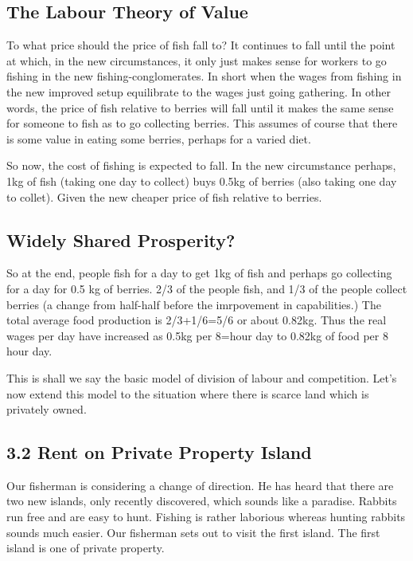 \documentclass[]{tufte-handout}
\begin{document}
\hypertarget{the-labour-theory-of-value}{%
\subsection{The Labour Theory of
Value}\label{the-labour-theory-of-value}}

To what price should the price of fish fall to? It continues to fall
until the point at which, in the new circumstances, it only just makes
sense for workers to go fishing in the new fishing-conglomerates. In
short when the wages from fishing in the new improved setup equilibrate
to the wages just going gathering. In other words, the price of fish
relative to berries will fall until it makes the same sense for someone
to fish as to go collecting berries. This assumes of course that there
is some value in eating some berries, perhaps for a varied diet.

So now, the cost of fishing is expected to fall. In the new circumstance
perhaps, 1kg of fish (taking one day to collect) buys 0.5kg of berries
(also taking one day to collet). Given the new cheaper price of fish
relative to berries.

\hypertarget{widely-shared-prosperity}{%
\subsection{Widely Shared Prosperity?}\label{widely-shared-prosperity}}

So at the end, people fish for a day to get 1kg of fish and perhaps go
collecting for a day for 0.5 kg of berries. 2/3 of the people fish, and
1/3 of the people collect berries (a change from half-half before the
imrpovement in capabilities.) The total average food production is
2/3+1/6=5/6 or about 0.82kg. Thus the real wages per day have increased
as 0.5kg per 8=hour day to 0.82kg of food per 8 hour day.

This is shall we say the basic model of division of labour and
competition. Let's now extend this model to the situation where there is
scarce land which is privately owned.

\hypertarget{rent-on-private-property-island}{%
\subsection{3.2 Rent on Private Property
Island}\label{rent-on-private-property-island}}

Our fisherman is considering a change of direction. He has heard that
there are two new islands, only recently discovered, which sounds like a
paradise. Rabbits run free and are easy to hunt. Fishing is rather
laborious whereas hunting rabbits sounds much easier. Our fisherman sets
out to visit the first island. The first island is one of private
property.
\end{document}
